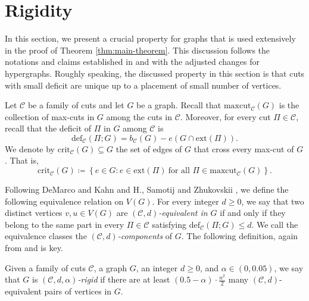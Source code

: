 \documentclass[11pt,a4paper,oneside,reqno]{amsart}
\newcommand{\cC}{\mathcal{C}}
\newcommand{\1}{\mathbbm{1}} %
\renewcommand{\le}{\leqslant}
\renewcommand{\ge}{\geqslant}
\newcommand{\deficit}{\mathrm{def}}
\newcommand{\ext}{\mathrm{ext}}
\newcommand{\crit}{\mathrm{crit}}
\begin{document}
\section{Rigidity}\label{section:rigidity}
In this section, we present a crucial property for graphs that is used extensively in the proof of Theorem \ref{thm:main-theorem}. This discussion follows the notations and claims established in \cite{DeMKah15Tur} and \cite{hoshen2023simonovits} with the adjusted changes for hypergraphs. Roughly speaking, the  discussed property in this section is that cuts with small deficit are unique up to a placement of small number of vertices.


Let $\cC$ be a family of cuts and let $G$ be a graph. Recall that $\text{maxcut}_{\cC}(G)$ is the collection of max-cuts in $G$ among the cuts in $\cC$. Moreover, for every cut $\Pi \in \cC$, recall that the deficit of $\Pi$ in $G$ among $\cC$ is
\[
    \deficit_{\cC}(\Pi; G) = b_\cC(G) - e(G \cap \ext(\Pi)).
\]
We denote by $\crit_{\cC}(G) \subseteq G$ the set of edges of $G$ that cross every max-cut of $G$. That is,
\[
    \crit_{\cC}(G) \coloneqq \left\{e \in G \colon e \in \ext(\Pi)\ \text{for all } \Pi \in \text{maxcut}_{\cC}(G)\right\}.
\]

Following DeMarco and Kahn \cite{DeMKah15Tur} and H., Samotij and Zhukovskii \cite{hoshen2024stabilitylargecutsrandom}, we define the following equivalence relation on $V(G)$. For every integer $d \ge 0$, we say that two distinct vertices $v, u \in V(G)$ are \textit{$(\cC, d)$-equivalent in $G$} if and only if they belong to the same part in every $\Pi \in \cC$ satisfying $\deficit_{\cC}(\Pi; G) \le d$. We call the equivalence classes the \textit{$(\cC, d)$-components} of $G$. The following definition, again from \cite{DeMKah15Tur} and \cite{hoshen2024stabilitylargecutsrandom} is key.

\begin{dfn}
    Given a family of cuts $\cC$, a graph $G$, an integer $d \ge 0$, and  $\alpha \in (0, 0.05)$, we say that $G$ is \textit{$(\cC, d, \alpha)$-rigid} if there are at least $(0.5-\alpha) \cdot \frac{n^2}{2}$ many $(\cC, d)$-equivalent pairs of vertices in $G$. 
\end{dfn}
\end{document}
